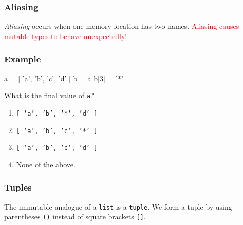 \documentclass[11pt]{beamer}
\begin{document}
\begin{frame}[fragile]
  \frametitle{Aliasing}
  \Enlarge

  \begin{itemize}
  \myitem  \emph{Aliasing} occurs when one memory location has two names. %
  \myitem  \textcolor{red}{Aliasing causes mutable types to behave unexpectedly!}
  \end{itemize}
  \begin{semiverbatim}

  \end{semiverbatim}
\end{frame}


\begin{frame}[fragile]
  \frametitle{Example}
  \Enlarge

  \begin{semiverbatim}
a = [ 'a', 'b', 'c', 'd' ]
b = a
b[3] = '*'
  \end{semiverbatim}
  What is the final value of \texttt{a}?
  \begin{enumerate}[label=\Alph*]
  \item  \texttt{[ 'a', 'b', '*', 'd' ]}
  \item  \texttt{[ 'a', 'b', 'c', '*' ]}
  \item  \texttt{[ 'a', 'b', 'c', 'd' ]}
  \item  None of the above.
  \end{enumerate}
\end{frame}

\begin{frame}[fragile]
  \frametitle{Tuples}
  \Enlarge

  \begin{itemize}
  \myitem  The immutable analogue of a \texttt{list} is a \texttt{tuple}. %
  \myitem  We form a tuple by using parentheses \texttt{()} instead of square brackets \texttt{[]}.
  \end{itemize}
\end{frame}
\end{document}
